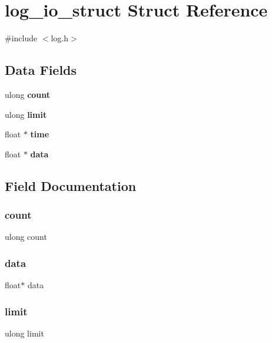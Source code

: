 \section{log\+\_\+io\+\_\+struct Struct Reference}
\label{structlog__io__struct}


{\ttfamily \#include $<$log.\+h$>$}

\subsection*{Data Fields}
\begin{DoxyCompactItemize}
\item 
ulong \textbf{ count}
\item 
ulong \textbf{ limit}
\item 
float $\ast$ \textbf{ time}
\item 
float $\ast$ \textbf{ data}
\end{DoxyCompactItemize}


\subsection{Field Documentation}
\mbox{\label{structlog__io__struct_aec2cfcb08132e96314e07b96dcda60fe}} 
\subsubsection{count}
{\footnotesize\ttfamily ulong count}

\mbox{\label{structlog__io__struct_a57ba9c584cf7756552b7d4370e93395f}} 
\subsubsection{data}
{\footnotesize\ttfamily float$\ast$ data}

\mbox{\label{structlog__io__struct_a1aafeaebc23c5017e813ab4816d159e8}} 
\subsubsection{limit}
{\footnotesize\ttfamily ulong limit}


